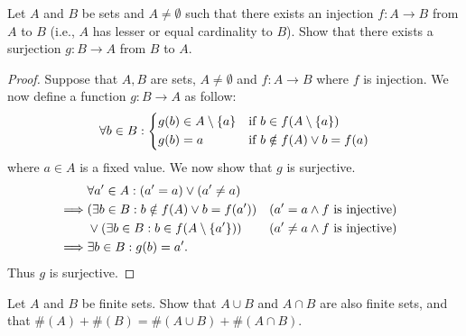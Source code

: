 \begin{ex}\label{ex:3.6.8}
  Let \(A\) and \(B\) be sets and \(A \neq \emptyset\) such that there exists an injection \(f : A \to B\) from \(A\) to \(B\) (i.e., \(A\) has lesser or equal cardinality to \(B\)).
  Show that there exists a surjection \(g : B \to A\) from \(B\) to \(A\).
\end{ex}

\begin{proof}
  Suppose that \(A, B\) are sets, \(A \neq \emptyset\) and \(f : A \to B\) where \(f\) is injection.
  We now define a function \(g : B \to A\) as follow:
  \[
    \forall b \in B : \begin{dcases}
      g(b) \in A \setminus \left\lbrace a\right\rbrace & \text{if } b \in f(A \setminus \left\lbrace a\right\rbrace) \\
      g(b) = a                     & \text{if } b \notin f(A) \lor b = f(a)
    \end{dcases}
  \]
  where \(a \in A\) is a fixed value.
  We now show that \(g\) is surjective.
  \begin{align*}
             & \forall a' \in A : (a' = a) \lor (a' \neq a)                                                            \\
    \implies & (\exists b \in B : b \notin f(A) \lor b = f(a'))       &  & \text{(\(a' = a \land f\) is injective)}    \\
             & \lor (\exists b \in B : b \in f(A \setminus \left\lbrace a'\right\rbrace)) &  & \text{(\(a' \neq a \land f\) is injective)} \\
    \implies & \exists b \in B : g(b) = a'.
  \end{align*}
  Thus \(g\) is surjective.
\end{proof}

\begin{ex}\label{ex:3.6.9}
  Let \(A\) and \(B\) be finite sets.
  Show that \(A \cup B\) and \(A \cap B\) are also finite sets, and that \(\#(A) + \#(B) = \#(A \cup B) + \#(A \cap B)\).
\end{ex}

